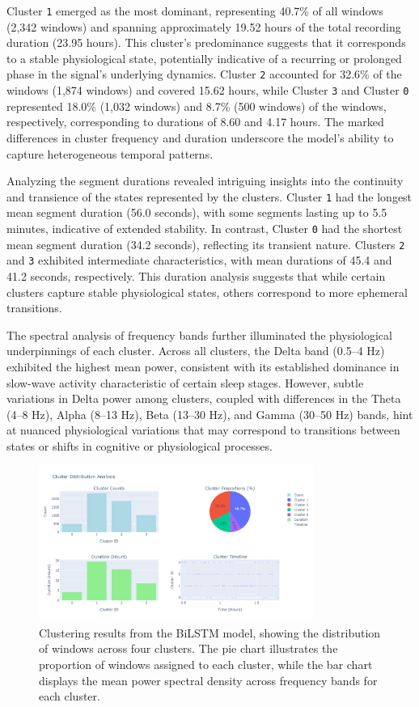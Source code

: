\documentclass[a4paper,12pt,twoside]{article}
\begin{document}
Cluster \texttt{1} emerged as the most dominant, representing 40.7\% of all windows (2,342 windows) and spanning approximately 19.52 hours of the total recording duration (23.95 hours). This cluster's predominance suggests that it corresponds to a stable physiological state, potentially indicative of a recurring or prolonged phase in the signal's underlying dynamics. Cluster \texttt{2} accounted for 32.6\% of the windows (1,874 windows) and covered 15.62 hours, while Cluster \texttt{3} and Cluster \texttt{0} represented 18.0\% (1,032 windows) and 8.7\% (500 windows) of the windows, respectively, corresponding to durations of 8.60 and 4.17 hours. The marked differences in cluster frequency and duration underscore the model's ability to capture heterogeneous temporal patterns.

Analyzing the segment durations revealed intriguing insights into the continuity and transience of the states represented by the clusters. Cluster \texttt{1} had the longest mean segment duration (56.0 seconds), with some segments lasting up to 5.5 minutes, indicative of extended stability. In contrast, Cluster \texttt{0} had the shortest mean segment duration (34.2 seconds), reflecting its transient nature. Clusters \texttt{2} and \texttt{3} exhibited intermediate characteristics, with mean durations of 45.4 and 41.2 seconds, respectively. This duration analysis suggests that while certain clusters capture stable physiological states, others correspond to more ephemeral transitions.

The spectral analysis of frequency bands further illuminated the physiological underpinnings of each cluster. Across all clusters, the Delta band (0.5–4 Hz) exhibited the highest mean power, consistent with its established dominance in slow-wave activity characteristic of certain sleep stages. However, subtle variations in Delta power among clusters, coupled with differences in the Theta (4–8 Hz), Alpha (8–13 Hz), Beta (13–30 Hz), and Gamma (30–50 Hz) bands, hint at nuanced physiological variations that may correspond to transitions between states or shifts in cognitive or physiological processes.

\begin{figure}[H]
\centering
\includegraphics[width=0.8\textwidth]{img/bilstm cluster distribution plots.png}
\caption{Clustering results from the BiLSTM model, showing the distribution of windows across four clusters. The pie chart illustrates the proportion of windows assigned to each cluster, while the bar chart displays the mean power spectral density across frequency bands for each cluster.}
\label{fig:biLSTM_clustering_results}
\end{figure}
\end{document}

